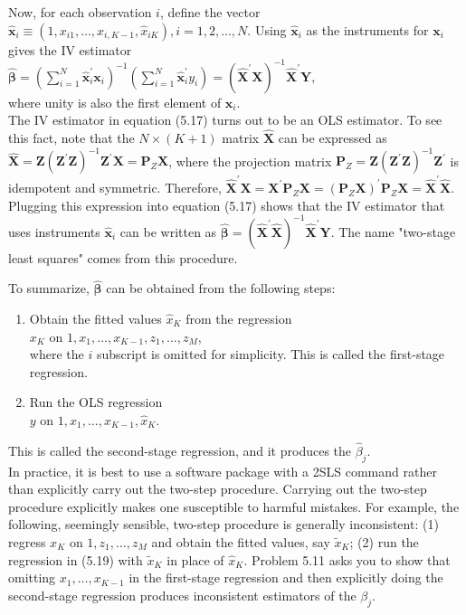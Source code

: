\documentclass[10pt]{article}
\begin{document}
Now, for each observation $i$, define the vector $\hat{\mathbf{x}}_{i} \equiv\left(1, x_{i 1}, \ldots, x_{i, K-1}, \hat{x}_{i K}\right), i= 1,2, \ldots, N$. Using $\hat{\mathbf{x}}_{i}$ as the instruments for $\mathbf{x}_{i}$ gives the IV estimator\\
$\hat{\boldsymbol{\beta}}=\left(\sum_{i=1}^{N} \hat{\mathbf{x}}_{i}^{\prime} \mathbf{x}_{i}\right)^{-1}\left(\sum_{i=1}^{N} \hat{\mathbf{x}}_{i}^{\prime} y_{i}\right)=\left(\hat{\mathbf{X}}^{\prime} \mathbf{X}\right)^{-1} \hat{\mathbf{X}}^{\prime} \mathbf{Y}$,\\
where unity is also the first element of $\mathbf{x}_{i}$.\\
The IV estimator in equation (5.17) turns out to be an OLS estimator. To see this fact, note that the $N \times(K+1)$ matrix $\hat{\mathbf{X}}$ can be expressed as $\hat{\mathbf{X}}=\mathbf{Z}\left(\mathbf{Z}^{\prime} \mathbf{Z}\right)^{-1} \mathbf{Z}^{\prime} \mathbf{X}= \mathbf{P}_{Z} \mathbf{X}$, where the projection matrix $\mathbf{P}_{Z}=\mathbf{Z}\left(\mathbf{Z}^{\prime} \mathbf{Z}\right)^{-1} \mathbf{Z}^{\prime}$ is idempotent and symmetric. Therefore, $\hat{\mathbf{X}}^{\prime} \mathbf{X}=\mathbf{X}^{\prime} \mathbf{P}_{Z} \mathbf{X}=\left(\mathbf{P}_{Z} \mathbf{X}\right)^{\prime} \mathbf{P}_{Z} \mathbf{X}=\hat{\mathbf{X}}^{\prime} \hat{\mathbf{X}}$. Plugging this expression into equation (5.17) shows that the IV estimator that uses instruments $\hat{\mathbf{x}}_{i}$ can be written as $\hat{\boldsymbol{\beta}}=\left(\hat{\mathbf{X}}^{\prime} \hat{\mathbf{X}}\right)^{-1} \hat{\mathbf{X}}^{\prime} \mathbf{Y}$. The name "two-stage least squares" comes from this procedure.

To summarize, $\hat{\boldsymbol{\beta}}$ can be obtained from the following steps:

\begin{enumerate}
  \item Obtain the fitted values $\hat{x}_{K}$ from the regression\\
$x_{K}$ on $1, x_{1}, \ldots, x_{K-1}, z_{1}, \ldots, z_{M}$,\\
where the $i$ subscript is omitted for simplicity. This is called the first-stage regression.
  \item Run the OLS regression\\
$y$ on $1, x_{1}, \ldots, x_{K-1}, \hat{x}_{K}$.
\end{enumerate}

This is called the second-stage regression, and it produces the $\hat{\beta}_{j}$.\\
In practice, it is best to use a software package with a 2SLS command rather than explicitly carry out the two-step procedure. Carrying out the two-step procedure explicitly makes one susceptible to harmful mistakes. For example, the following, seemingly sensible, two-step procedure is generally inconsistent: (1) regress $x_{K}$ on $1, z_{1}, \ldots, z_{M}$ and obtain the fitted values, say $\tilde{x}_{K}$; (2) run the regression in (5.19) with $\tilde{x}_{K}$ in place of $\hat{x}_{K}$. Problem 5.11 asks you to show that omitting $x_{1}, \ldots, x_{K-1}$ in the first-stage regression and then explicitly doing the second-stage regression produces inconsistent estimators of the $\beta_{j}$.
\end{document}
